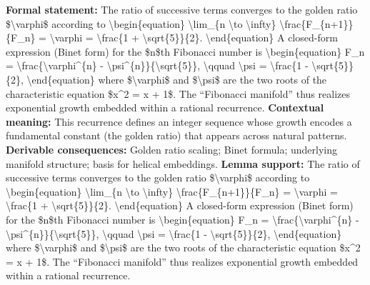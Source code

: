 \begingroup\footnotesize\setlength{\emergencystretch}{3em}\sloppy
\textbf{Formal statement:} The ratio of successive terms converges to the golden ratio \$\textbackslash{}varphi\$ according to \textbackslash{}begin\{equation\} \textbackslash{}lim\_\{n \textbackslash{}to \textbackslash{}infty\} \textbackslash{}frac\{F\_\{n+1\}\}\{F\_n\} = \textbackslash{}varphi = \textbackslash{}frac\{1 + \textbackslash{}sqrt\{5\}\}\{2\}. \textbackslash{}end\{equation\} A closed-form expression (Binet form) for the \$n\$th Fibonacci number is \textbackslash{}begin\{equation\} F\_n = \textbackslash{}frac\{\textbackslash{}varphi\textasciicircum{}\{n\} - \textbackslash{}psi\textasciicircum{}\{n\}\}\{\textbackslash{}sqrt\{5\}\}, \textbackslash{}qquad \textbackslash{}psi = \textbackslash{}frac\{1 - \textbackslash{}sqrt\{5\}\}\{2\}, \textbackslash{}end\{equation\} where \$\textbackslash{}varphi\$ and \$\textbackslash{}psi\$ are the two roots of the characteristic equation \$x\textasciicircum{}2 = x + 1\$. The ``Fibonacci manifold'' thus realizes exponential growth embedded within a rational recurrence.
\textbf{Contextual meaning:} This recurrence defines an integer sequence whose growth encodes a fundamental constant (the golden ratio) that appears across natural patterns.
\textbf{Derivable consequences:} Golden ratio scaling; Binet formula; underlying manifold structure; basis for helical embeddings.
\textbf{Lemma support:} The ratio of successive terms converges to the golden ratio \$\textbackslash{}varphi\$ according to \textbackslash{}begin\{equation\} \textbackslash{}lim\_\{n \textbackslash{}to \textbackslash{}infty\} \textbackslash{}frac\{F\_\{n+1\}\}\{F\_n\} = \textbackslash{}varphi = \textbackslash{}frac\{1 + \textbackslash{}sqrt\{5\}\}\{2\}. \textbackslash{}end\{equation\} A closed-form expression (Binet form) for the \$n\$th Fibonacci number is \textbackslash{}begin\{equation\} F\_n = \textbackslash{}frac\{\textbackslash{}varphi\textasciicircum{}\{n\} - \textbackslash{}psi\textasciicircum{}\{n\}\}\{\textbackslash{}sqrt\{5\}\}, \textbackslash{}qquad \textbackslash{}psi = \textbackslash{}frac\{1 - \textbackslash{}sqrt\{5\}\}\{2\}, \textbackslash{}end\{equation\} where \$\textbackslash{}varphi\$ and \$\textbackslash{}psi\$ are the two roots of the characteristic equation \$x\textasciicircum{}2 = x + 1\$. The ``Fibonacci manifold'' thus realizes exponential growth embedded within a rational recurrence.\par
\endgroup

